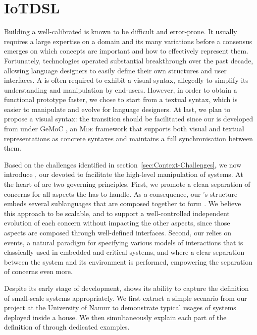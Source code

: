 \section{IoTDSL}
\label{sec:IoTDSL}

Building a well-calibrated \DSL is known to be difficult and error-prone. It usually requires a large expertise on a domain and its many variations before a consensus emerges on which concepts are important and how to effectively represent them. Fortunately, \MDE technologies operated substantial breakthrough over the past decade, allowing language designers to easily define their own \DSL structures and user interfaces. A \DSL is often required to exhibit a visual syntax, allegedly to simplify its understanding and manipulation by end-users. However, in order to obtain a functional prototype faster, we chose to start from a textual syntax, which is easier to manipulate and evolve for language designers. At last, we plan to propose a visual syntax: the transition should be facilitated since our \DSL is developed from under GeMoC \cite{Bousse-Degueule-Vojtisek-etAl:2016}, an \textsc{Mde} framework that supports both visual and textual representations as concrete syntaxes and maintains a full synchronisation between them.

Based on the challenges identified in section~\ref{sec:Context-Challenges}, we now introduce \IOTDSL, our \DSL devoted to facilitate the high-level manipulation of \IOT systems. At the heart of \IOTDSL are two governing principles. First, we promote a clean separation of concerns for all aspects the \DSL has to handle. As a consequence, our \DSL's structure embeds several sublanguages that are composed together to form \IOTDSL. We believe this approach to be scalable, and to support a well-controlled independent evolution of each concern without impacting the other aspects, since those aspects are composed through well-defined interfaces. Second, our \DSL relies on events, a natural paradigm for specifying various models of interactions that is classically used in embedded and critical systems, and where a clear separation between the system and its environment is performed, empowering the separation of concerns even more.

Despite its early stage of development, \IOTDSL shows its ability to capture the definition of small-scale \IOT systems appropriately. We first extract a simple scenario from our project at the University of Namur to demonstrate typical usages of \IOT systems deployed inside a house. We then simultaneously explain each part of the definition of \IOTDSL through dedicated examples.


